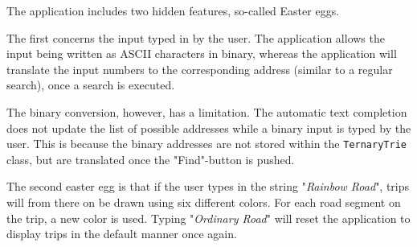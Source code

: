 The application includes two hidden features, so-called Easter eggs.

The first concerns the input typed in by the user. The application allows the input being written as ASCII characters in binary, whereas the application will translate the input numbers to the corresponding address (similar to a regular search), once a search is executed.

The binary conversion, however, has a limitation. The automatic text completion does not update the list of possible addresses while a binary input is typed by the user. This is because the binary addresses are not stored within the \texttt{TernaryTrie} class, but are translated once the "Find"-button is pushed.

The second easter egg is that if the user types in the string "\textit{Rainbow Road}", trips will from there on be drawn using six different colors. For each road segment on the trip, a new color is used. Typing "\textit{Ordinary Road}" will reset the application to display trips in the default manner once again.